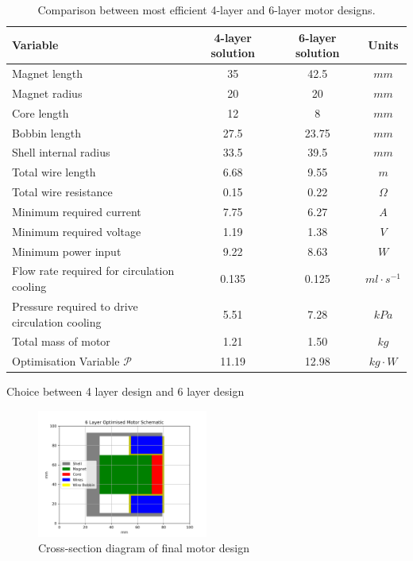 \documentclass[a4paper,12pt]{article}
\begin{document}
\begin{table} [h!]
	\centering
	\caption{Comparison between most efficient 4-layer and 6-layer motor designs.}
	\label{tb:optoutput}
	\begin{tabular}{M | c | c | c} 
		\textbf{Variable} & \textbf{4-layer solution} & \textbf{6-layer solution} & \textbf{Units} \\ [0.5ex] 
		\hline\hline
		Magnet length & 35 & 42.5 & $mm$ \\ 
		\hline
		Magnet radius & 20 & 20 & $mm$ \\ 
		\hline
		Core length & 12 & 8 & $mm$ \\ 
		\hline
		Bobbin length & 27.5 & 23.75 & $mm$ \\ 
		\hline
		Shell internal radius & 33.5 & 39.5 & $mm$ \\ 
		\hline
		Total wire length & 6.68 & 9.55& $m$ \\ 
		\hline
		Total wire resistance & 0.15 & 0.22 & $\Omega$ \\ 
		\hline
		Minimum required current & 7.75 & 6.27 & $A$ \\ 
		\hline
		Minimum required voltage & 1.19 & 1.38 & $V$ \\ 
		\hline
		Minimum power input & 9.22 & 8.63 & $W$ \\ 
		\hline
		Flow rate required for circulation cooling & 0.135 & 0.125 & $ml\cdot s^{-1}$ \\ 
		\hline
		Pressure required to drive circulation cooling & 5.51 & 7.28 & $kPa$ \\ 
		\hline
		Total mass of motor & 1.21 & 1.50 & $kg$ \\ 
		\hline
		Optimisation Variable $\mathcal{P}$ & 11.19 & 12.98 & $kg\cdot W$ \\ 
		\hline
	\end{tabular}
\end{table}

Choice between 4 layer design and 6 layer design

\begin{figure}[h!] 
	\centering
	\includegraphics[width=0.5\textwidth]{finalDesign_layers.png}
	\caption{Cross-section diagram of final motor design}
	\label{fg:finalmotor}
\end{figure}
\end{document}

